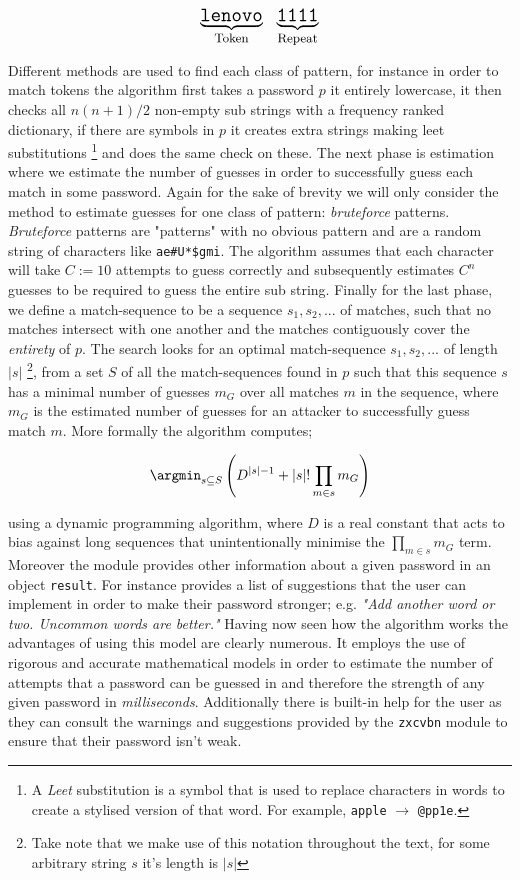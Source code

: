 \[
  \Large
  \underbrace{ \mathtt{lenovo} }_\text{\small Token} 
  \; \; \;
  \underbrace{ \mathtt{1111} }_\text{\small Repeat}
\]

Different methods are used to find each class of pattern, for 
instance in order to match tokens the algorithm first takes
a password $p$ it entirely lowercase, it then checks all 
$n(n+1)/2$ non-empty sub strings with a frequency ranked
dictionary, if there are symbols in $p$ it creates extra 
strings making leet substitutions \footnote{A \textit{Leet}
substitution is a symbol that is used to replace characters in words
to create a stylised version of that word. For example,
\texttt{apple} $\rightarrow$ \texttt{@pp1e}.}
and does the same check on these. The next phase is
estimation where we estimate the number of guesses in order
to successfully guess each match in some password. Again
for the sake of brevity we will only consider the method to 
estimate guesses for one class of pattern: \textit{bruteforce}
patterns. \textit{Bruteforce} patterns are "patterns" with no
obvious pattern and are a random string of characters like
\texttt{ae\#U*\$gmi}. The algorithm assumes that each
character will take $C := 10$ attempts to guess correctly and 
subsequently estimates $C^n$ guesses to be required to guess
the entire sub string. Finally for the last phase, we define a
match-sequence to be a sequence $s_1, s_2, ...$ of matches, 
such that no matches intersect with one another and the
matches contiguously cover the \textit{entirety} of $p$. 
The search looks
for an optimal match-sequence $s_1, s_2, ...$ of length
$\left|s\right|$ \footnote{Take note that we make use of
this notation throughout the text, for some arbitrary string $s$
it's length is $\left|s\right|$}, from a set $S$ of all the match-sequences
found in $p$ such that this sequence $s$ has a minimal number
of guesses $m_G$ over all matches $m$ in the sequence, where 
$m_G$ is the estimated number of guesses for an attacker to 
successfully guess match $m$. More formally the algorithm 
computes;

\[
  \argmin_{s \subseteq S} \left( D^{\left|s\right| -1} + 
  \left|s\right|! \prod_{m \in s} m_G \right)
\]

using a dynamic programming algorithm,
where $D$ is a real constant that acts to bias against long
sequences that unintentionally minimise the 
$\prod_{m \in s} m_G$ term. Moreover the module provides other
information about a given password in an object 
\texttt{result}. For instance 
 provides a list of 
suggestions that the user can implement in order to make their
password stronger; e.g. \textit{"Add another word or two.
Uncommon words are better."} Having now seen how the 
algorithm works the advantages of using this model are clearly
numerous. It employs the use of
rigorous and accurate mathematical models in order to estimate
the number of attempts that a password can be guessed in and 
therefore the strength of any given password in 
\emph{milliseconds}. Additionally there is built-in help for 
the user as they can consult the warnings and suggestions 
provided by the \texttt{zxcvbn} module to ensure that their
password isn't weak. \\ \vspace{0.2cm}

